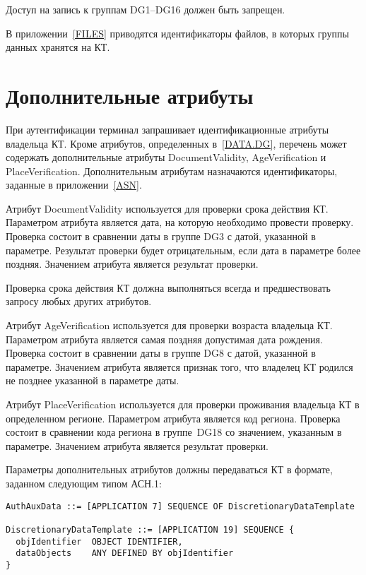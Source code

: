 Доступ на запись к группам DG1--DG16 должен быть запрещен.
 
В приложении~\ref{FILES} приводятся идентификаторы файлов, 
в которых группы данных хранятся на КТ.

\section{Дополнительные атрибуты}\label{DATA.Optional}

При аутентификации терминал запрашивает идентификационные атрибуты
владельца КТ. Кроме атрибутов, определенных в~\ref{DATA.DG}, 
перечень может содержать дополнительные атрибуты DocumentValidity, 
AgeVerification и PlaceVerification. Дополнительным атрибутам назначаются 
идентификаторы, заданные в приложении~\ref{ASN}. 

Атрибут DocumentValidity используется для проверки срока действия КТ. 
Параметром атрибута является дата, на которую необходимо провести 
проверку. Проверка состоит в сравнении даты в группе DG3 
с датой, указанной в параметре. Результат проверки будет 
отрицательным, если дата в параметре более поздняя. Значением атрибута 
является результат проверки. 

Проверка срока действия КТ должна выполняться всегда и предшествовать 
запросу любых других атрибутов. 

Атрибут AgeVerification используется для проверки возраста владельца КТ. 
Параметром атрибута является самая поздняя допустимая дата рождения. 
Проверка состоит в сравнении даты в группе DG8 с датой, указанной в параметре. 
Значением атрибута является признак того, что владелец КТ 
родился не позднее указанной в параметре даты. 

Атрибут PlaceVerification используется для проверки проживания владельца 
КТ в определенном регионе. Параметром атрибута является код региона. 
Проверка состоит в сравнении кода региона в группе~DG18 со значением, указанным 
в параметре. Значением атрибута является результат проверки. 

Параметры дополнительных атрибутов должны передаваться КТ в формате, 
заданном следующим типом АСН.1: 
%
\begin{verbatim}
AuthAuxData ::= [APPLICATION 7] SEQUENCE OF DiscretionaryDataTemplate

DiscretionaryDataTemplate ::= [APPLICATION 19] SEQUENCE {
  objIdentifier  OBJECT IDENTIFIER,
  dataObjects    ANY DEFINED BY objIdentifier
}
\end{verbatim}

